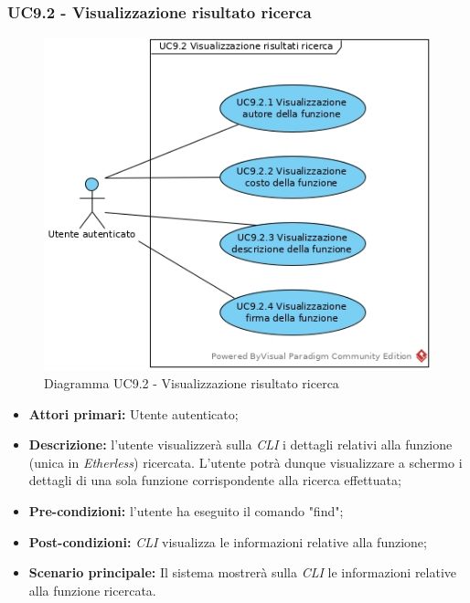 \subsubsection{UC9.2 - Visualizzazione risultato ricerca}
\begin{figure}[h]
	\centering
	\includegraphics[width=0.7\linewidth]{res/img/UC9.2.jpg}
	\caption{Diagramma UC9.2 - Visualizzazione risultato ricerca}
\end{figure}
\begin{itemize}
	\item \textbf{Attori primari:} Utente autenticato;
	\item \textbf{Descrizione:} l'utente visualizzerà sulla \textit{CLI\glo} i dettagli relativi alla funzione (unica in \textit{Etherless}) ricercata. L'utente potrà dunque visualizzare a schermo i dettagli di una sola funzione corrispondente alla ricerca effettuata;
	\item \textbf{Pre-condizioni:} l'utente ha eseguito il comando "find";
	\item \textbf{Post-condizioni:} \textit{CLI\glo} visualizza le informazioni relative alla funzione;
	\item \textbf{Scenario principale:} Il sistema mostrerà sulla \textit{CLI\glo} le informazioni relative alla funzione ricercata.
\end{itemize}
